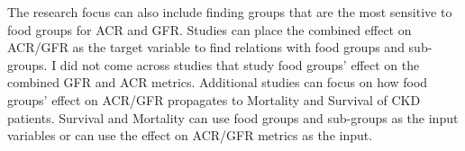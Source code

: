 \flushleft \justifying The research focus can also include finding groups that are the most sensitive to food groups for ACR and GFR. Studies can place the combined effect on ACR/GFR as the target variable to find relations with food groups and sub-groups. I did not come across studies that study food groups' effect on the combined GFR and ACR metrics. Additional studies can focus on how food groups' effect on ACR/GFR propagates to Mortality and Survival of CKD patients. Survival and Mortality can use food groups and sub-groups as the input variables or can use the effect on ACR/GFR metrics as the input.